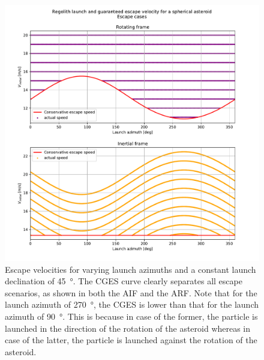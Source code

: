 \begin{figure}[htb]
\centering
\captionsetup{justification=centering}
\includegraphics[width=\textwidth, height=0.5\textheight, keepaspectratio=true]{non_conservative_escape_speed/spherical_asteroid_conservative_escape_speed.pdf}
\caption{Escape velocities for varying launch azimuths and a constant launch declination of \protect\SI{45}{\degree}. The \gls{CGES} curve clearly separates all escape scenarios, as shown in both the \protect\gls{AIF} and the \protect\gls{ARF}. Note that for the launch azimuth of \SI{270}{\degree}, the \gls{CGES} is lower than that for the launch azimuth of \SI{90}{\degree}. This is because in case of the former, the particle is launched in the direction of the rotation of the asteroid whereas in case of the latter, the particle is launched against the rotation of the asteroid.}
\label{fig:conservative_spherical_asteroid_escape}
\end{figure}
\FloatBarrier


